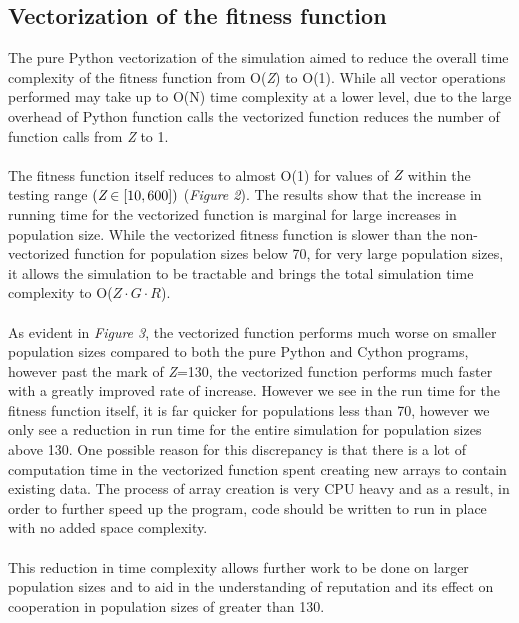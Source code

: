 \documentclass[10pt,a4paper]{article}
\begin{document}
\subsection{Vectorization of the fitness function}
The pure Python vectorization of the simulation aimed to reduce the overall time complexity of the fitness function from O(\emph{Z}) to O(1).
While all vector operations performed may take up to O(N) time complexity at a lower level, due to the large overhead of Python function calls the vectorized function reduces the number of function calls from \emph{Z} to 1.
\\\\
The fitness function itself reduces to almost O(1) for values of $\emph{Z}$ within the testing range $(\emph{Z} \in [10, 600])$ (\textit{Figure 2}).
The results show that the increase in running time for the vectorized function is marginal for large increases in population size.
While the vectorized fitness function is slower than the non-vectorized function for population sizes below 70, for very large population sizes, it allows the simulation to be tractable and brings the total simulation time complexity to O(\emph{$Z \cdot G\cdot R$}).
\\\\
As evident in \textit{Figure 3}, the vectorized function performs much worse on smaller population sizes compared to both the pure Python and Cython programs, however past the mark of \emph{Z}=130, the vectorized function performs much faster with a greatly improved rate of increase.
However we see in the run time for the fitness function itself, it is far quicker for populations less than 70, however we only see a reduction in run time for the entire simulation for population sizes above 130.
One possible reason for this discrepancy is that there is a lot of computation time in the vectorized function spent creating new arrays to contain existing data.
The process of array creation is very CPU heavy and as a result, in order to further speed up the program, code should be written to run in place with no added space complexity.
\\\\
This reduction in time complexity allows further work to be done on larger population sizes and to aid in the understanding of reputation and its effect on cooperation in population sizes of greater than 130.
\end{document}
